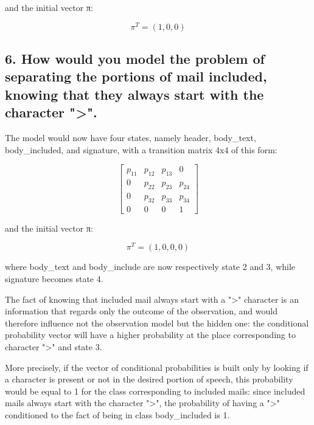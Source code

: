 \documentclass[11pt]{article}
\begin{document}
and the initial vector π:

\[π^{T} = (1, 0, 0)\]

\subsection{6. How would you model the problem of separating the
portions of mail included, knowing that they always start with the
character
"\textgreater{}".}\label{how-would-you-model-the-problem-of-separating-the-portions-of-mail-included-knowing-that-they-always-start-with-the-character-.}

The model would now have four states, namely header, body\_text,
body\_included, and signature, with a transition matrix 4x4 of this
form:

\[ \begin{bmatrix}
    p_{11}       & p_{12} & p_{13} & 0 \\
     0       & p_{22} & p_{23} & p_{24} \\
     0       & p_{32} & p_{33} & p_{34} \\
     0       & 0 & 0 & 1
 \end{bmatrix} \]

and the initial vector π:

\[\pi^{T} = (1, 0, 0, 0)\]

where body\_text and body\_include are now respectively state 2 and 3,
while signature becomes state 4.

The fact of knowing that included mail always start with a
"\textgreater{}" character is an information that regards only the
outcome of the observation, and would therefore influence not the
observation model but the hidden one: the conditional probability vector
will have a higher probability at the place corresponding to character
"\textgreater{}" and state 3.

More precisely, if the vector of conditional probabilities is built only
by looking if a character is present or not in the desired portion of
speech, this probability would be equal to 1 for the class corresponding
to included mails: since included mails always start with the character
"\textgreater{}", the probability of having a "\textgreater{}"
conditioned to the fact of being in class body\_included is 1.


    
    
    
    
\end{document}
